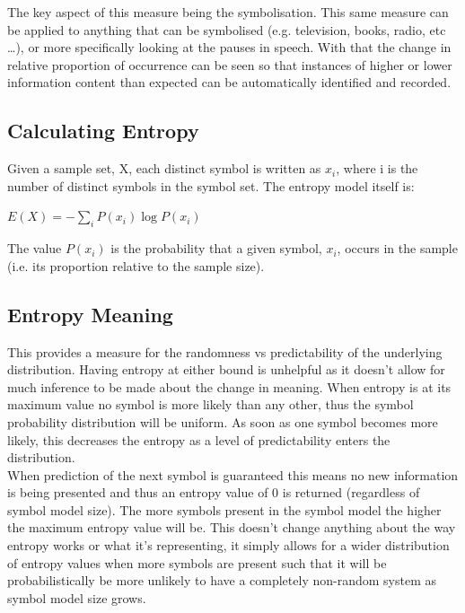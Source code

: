 The key aspect of this measure being the symbolisation. This same measure can be applied to anything that can be symbolised (e.g. television, books, radio, etc \ldots), or more specifically looking at the pauses in speech. With that the change in relative proportion of occurrence can be seen so that instances of higher or lower information content than expected can be automatically identified and recorded.


\subsection{Calculating Entropy}
Given a sample set, X, each distinct symbol is written as $x_{i}$, where i is the number of distinct symbols in the symbol set. The entropy model itself is:\\

\centerline{$E(X) = -\sum_i P(x_i)\log P(x_i)$} 

\mediumskip
The value $P(x_i)$ is the probability that a given symbol, $x_i$, occurs in the sample (i.e. its proportion relative to the sample size).


\subsection{Entropy Meaning}
This provides a measure for the randomness vs predictability of the underlying distribution. Having entropy at either bound is unhelpful as it doesn't allow for much inference to be made about the change in meaning. When entropy is at its maximum value no symbol is more likely than any other, thus the symbol probability distribution will be uniform. As soon as one symbol becomes more likely, this decreases the entropy as a level of predictability enters the distribution. \\

When prediction of the next symbol is guaranteed this means no new information is being presented and thus an entropy value of 0 is returned (regardless of symbol model size). The more symbols present in the symbol model the higher the maximum entropy value will be. This doesn't change anything about the way entropy works or what it's representing, it simply allows for a wider distribution of entropy values when more symbols are present such that it will be probabilistically be more unlikely to have a completely non-random system as symbol model size grows. \\ 

